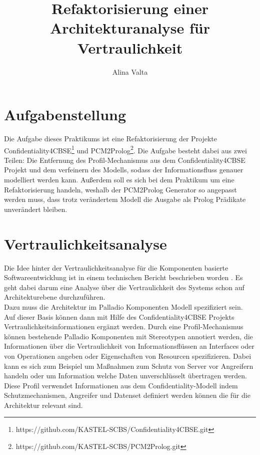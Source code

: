 \documentclass[twoside, ngerman]{sdqseminar}
\author{Alina Valta}
\title{Refaktorisierung einer Architekturanalyse für Vertraulichkeit}
\begin{document}
\setpdf

\maketitle

 

\begin{abstract}
%
\end{abstract}



%
%
%


\section{Aufgabenstellung}
Die Aufgabe dieses Praktikums ist eine Refaktorisierung der Projekte Confidentiality4CBSE\footnote{https://github.com/KASTEL-SCBS/Confidentiality4CBSE.git} und PCM2Prolog\footnote{https://github.com/KASTEL-SCBS/PCM2Prolog.git}. Die Aufgabe besteht dabei aus zwei Teilen: Die Entfernung des Profil-Mechanismus aus dem Confidentiality4CBSE Projekt und dem verfeinern des Modells, sodass der Informationsfluss genauer modelliert werden kann. Außerdem soll es sich bei dem Praktikum um eine Refaktorisierung handeln, weshalb der PCM2Prolog Generator so angepasst werden muss, dass trotz verändertem Modell die Ausgabe als Prolog Prädikate unverändert bleiben.  

\section{Vertraulichkeitsanalyse}
Die Idee hinter der Vertraulichkeitsanalyse für die Komponenten basierte Softwareentwicklung ist in einem technischen Bericht beschrieben worden \cite{kramer2017model}. Es geht dabei darum eine Analyse über die Vertraulichkeit des Systems schon auf Architekturebene durchzuführen. \\

Dazu muss die Architektur im Palladio Komponenten Modell spezifiziert sein. Auf dieser Basis können dann mit Hilfe des Confidentiality4CBSE Projekts Vertraulichkeitsinformationen ergänzt werden. Durch eine Profil-Mechanismus können bestehende Palladio Komponenten mit Stereotypen annotiert werden, die Informationen über die Vertraulichkeit von Informationsflüssen an Interfaces oder von Operationen angeben oder Eigenschaften von Resourcen spezifizieren. Dabei kann es sich zum Beispiel um Maßnahmen zum Schutz von Server vor Angreifern handeln oder um Information welche Daten unverschlüsselt übertragen werden. Diese Profil verwendet Informationen aus dem Confidentiality-Modell indem Schutzmechanismen, Angreifer und Datenset definiert werden können die für die Architektur relevant sind. \\
\end{document}
